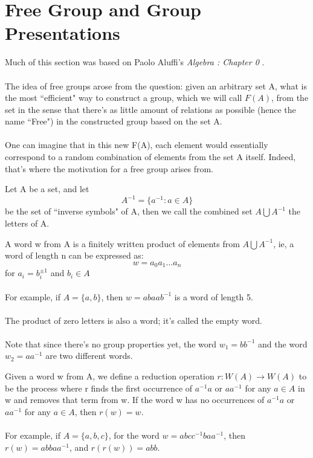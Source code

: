\section{Free Group and Group Presentations}
Much of this section was based on Paolo Aluffi's \textit{Algebra : Chapter 0} \cite{aluffi2021algebra}.\\\\
The idea of free groups arose from the question: given an arbitrary set A, what is the most ``efficient" way to construct a group, which we will call $F(A)$, from the set in the sense that there's as little amount of relations as possible (hence the name ``Free") in the constructed group based on the set A.\\\\
One can imagine that in this new F(A), each element would essentially correspond to a random combination of elements from the set A itself. Indeed, that's where the motivation for a free group arises from.
\begin{definition}[Letters] Let A be a set, and let $$A^{-1} = \{a^{-1} : a \in A\}$$ be the set of ``inverse symbols" of A, then we call the combined set $A \bigcup A^{-1}$ the letters of A.\\
\end{definition}
\begin{definition}[Word] A word w from A is a finitely written product of elements from $A\bigcup A^{-1}$, ie, a word of length n can be expressed as:
\[w = a_0a_1...a_n\]
for $a_i = b_i^{\pm 1}$ and $b_i \in A$\\\\
For example, if $A = \{a, b\}$, then $w = abaab^{-1}$ is a word of length 5.\\\\
The product of zero letters is also a word; it's called the empty word.\\\\
Note that since there's no group properties yet, the word $w_1 = bb^{-1}$ and the word $w_2 = aa^{-1}$ are two different words.\\
\end{definition}

\begin{definition}[Reduction] Given a word w from A, we define a reduction operation $r: W(A) \to W(A)$ to be the process where r finds the first occurrence of $a^{-1}a$ or $aa^{-1}$ for any $a \in A$ in w and removes that term from w. If the word w has no occurrences of $a^{-1}a$ or $aa^{-1}$ for any $a \in A$, then $r(w) = w$.\\\\
For example, if $A = \{a, b, c\}$, for the word $w = abcc^{-1}baa^{-1}$, then $r(w) = abbaa^{-1}$, and $r(r(w)) = abb$.\\
\end{definition}

